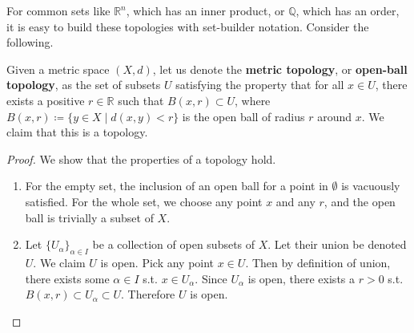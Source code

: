   For common sets like $\mathbb{R}^n$, which has an inner product, or $\mathbb{Q}$, which has an order, it is easy to build these topologies with set-builder notation. Consider the following. 

  \begin{definition}
    Given a metric space $(X, d)$, let us denote the \textbf{metric topology}, or \textbf{open-ball topology}, as the set of subsets $U$ satisfying the property that for all $x \in U$, there exists a positive $r \in \mathbb{R}$ such that $B(x, r) \subset U$, where $B(x, r) \coloneqq \{y \in X \mid d(x, y) < r\}$ is the open ball of radius $r$ around $x$. We claim that this is a topology. 
  \end{definition} 
  \begin{proof}
    We show that the properties of a topology hold. 
    \begin{enumerate} 
      \item For the empty set, the inclusion of an open ball for a point in $\emptyset$ is vacuously satisfied. For the whole set, we choose any point $x$ and any $r$, and the open ball is trivially a subset of $X$. 

      \item Let $\{U_\alpha\}_{\alpha \in I}$ be a collection of open subsets of $X$. Let their union be denoted $U$. We claim $U$ is open. Pick any point $x \in U$. Then by definition of union, there exists some $\alpha \in I$ s.t. $x \in U_\alpha$. Since $U_\alpha$ is open, there exists a $r > 0$ s.t. $B(x, r) \subset U_\alpha \subset U$. Therefore $U$ is open. 


\end{enumerate}
\end{proof}
